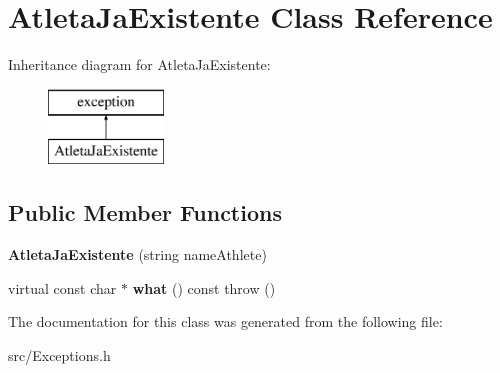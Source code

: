 \hypertarget{class_atleta_ja_existente}{}\section{Atleta\+Ja\+Existente Class Reference}
\label{class_atleta_ja_existente}
Inheritance diagram for Atleta\+Ja\+Existente\+:\begin{figure}[H]
\begin{center}
\leavevmode
\includegraphics[height=2.000000cm]{class_atleta_ja_existente}
\end{center}
\end{figure}
\subsection*{Public Member Functions}
\begin{DoxyCompactItemize}
\item 
\hypertarget{class_atleta_ja_existente_ab51b6a99643cf6969b41fd94e3282775}{}{\bfseries Atleta\+Ja\+Existente} (string name\+Athlete)\label{class_atleta_ja_existente_ab51b6a99643cf6969b41fd94e3282775}

\item 
\hypertarget{class_atleta_ja_existente_a25c8a0dbbae34cced2758e0e3ca7c041}{}virtual const char $\ast$ {\bfseries what} () const   throw ()\label{class_atleta_ja_existente_a25c8a0dbbae34cced2758e0e3ca7c041}

\end{DoxyCompactItemize}


The documentation for this class was generated from the following file\+:\begin{DoxyCompactItemize}
\item 
src/Exceptions.\+h\end{DoxyCompactItemize}
